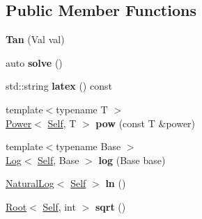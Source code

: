 \subsection*{Public Member Functions}
\begin{DoxyCompactItemize}
\item 
\hypertarget{classlatex_1_1math_1_1Tan_a012f8df65dcbf511448933258371d91e}{{\bfseries Tan} (Val val)}\label{classlatex_1_1math_1_1Tan_a012f8df65dcbf511448933258371d91e}

\item 
\hypertarget{classlatex_1_1math_1_1Tan_a787843e12e03053954a8e540793fc204}{auto {\bfseries solve} ()}\label{classlatex_1_1math_1_1Tan_a787843e12e03053954a8e540793fc204}

\item 
\hypertarget{classlatex_1_1math_1_1Tan_a6370975f7fb386d4771162b6c429b8e7}{std\-::string {\bfseries latex} () const }\label{classlatex_1_1math_1_1Tan_a6370975f7fb386d4771162b6c429b8e7}

\item 
\hypertarget{classlatex_1_1math_1_1Tan_a4a0639ce52f550528faf541b004f50ef}{{\footnotesize template$<$typename T $>$ }\\\hyperlink{classlatex_1_1math_1_1Power}{Power}$<$ \hyperlink{classlatex_1_1math_1_1Tan}{Self}, T $>$ {\bfseries pow} (const T \&power)}\label{classlatex_1_1math_1_1Tan_a4a0639ce52f550528faf541b004f50ef}

\item 
\hypertarget{classlatex_1_1math_1_1Tan_a5d758af3777a78d1c579525b460c21cf}{{\footnotesize template$<$typename Base $>$ }\\\hyperlink{classlatex_1_1math_1_1Log}{Log}$<$ \hyperlink{classlatex_1_1math_1_1Tan}{Self}, Base $>$ {\bfseries log} (Base base)}\label{classlatex_1_1math_1_1Tan_a5d758af3777a78d1c579525b460c21cf}

\item 
\hypertarget{classlatex_1_1math_1_1Tan_aacc9d4e87a9eb8be1d2176b2d55055d4}{\hyperlink{classlatex_1_1math_1_1NaturalLog}{Natural\-Log}$<$ \hyperlink{classlatex_1_1math_1_1Tan}{Self} $>$ {\bfseries ln} ()}\label{classlatex_1_1math_1_1Tan_aacc9d4e87a9eb8be1d2176b2d55055d4}

\item 
\hypertarget{classlatex_1_1math_1_1Tan_aa28d4e9296ee3384a47da6bc6f4c9a1c}{\hyperlink{classlatex_1_1math_1_1Root}{Root}$<$ \hyperlink{classlatex_1_1math_1_1Tan}{Self}, int $>$ {\bfseries sqrt} ()}\label{classlatex_1_1math_1_1Tan_aa28d4e9296ee3384a47da6bc6f4c9a1c}

\end{DoxyCompactItemize}
